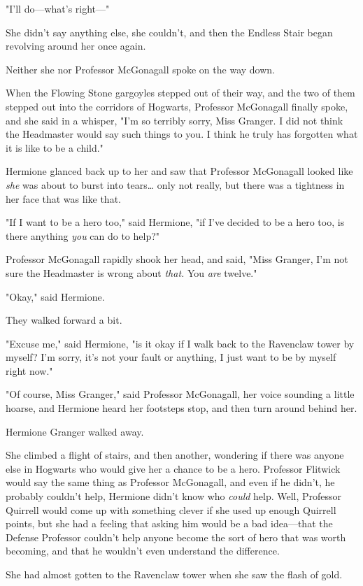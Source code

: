 "I'll do---what's right---"

She didn't say anything else, she couldn't, and then the Endless Stair began 
revolving around her once again.

Neither she nor Professor McGonagall spoke on the way down.

When the Flowing Stone gargoyles stepped out of their way, and the two of them 
stepped out into the corridors of Hogwarts, Professor McGonagall finally spoke, 
and she said in a whisper, "I'm so terribly sorry, Miss Granger. I did not 
think the Headmaster would say such things to you. I think he truly has 
forgotten what it is like to be a child."

Hermione glanced back up to her and saw that Professor McGonagall looked like 
\emph{she} was about to burst into tears{\ldots} only not really, but there was 
a tightness in her face that was like that.

"If I want to be a hero too," said Hermione, "if I've decided to be a hero too, 
is there anything \emph{you} can do to help?"

Professor McGonagall rapidly shook her head, and said, "Miss Granger, I'm not 
sure the Headmaster is wrong about \emph{that.} You \emph{are} twelve."

"Okay," said Hermione.

They walked forward a bit.

"Excuse me," said Hermione, "is it okay if I walk back to the Ravenclaw tower 
by myself? I'm sorry, it's not your fault or anything, I just want to be by 
myself right now."

"Of course, Miss Granger," said Professor McGonagall, her voice sounding a 
little hoarse, and Hermione heard her footsteps stop, and then turn around 
behind her.

Hermione Granger walked away.

She climbed a flight of stairs, and then another, wondering if there was anyone 
else in Hogwarts who would give her a chance to be a hero. Professor Flitwick 
would say the same thing as Professor McGonagall, and even if he didn't, he 
probably couldn't help, Hermione didn't know who \emph{could} help. Well, 
Professor Quirrell would come up with something clever if she used up enough 
Quirrell points, but she had a feeling that asking him would be a bad 
idea---that the Defense Professor couldn't help anyone become the sort of hero 
that was worth becoming, and that he wouldn't even understand the difference.

She had almost gotten to the Ravenclaw tower when she saw the flash of gold.
